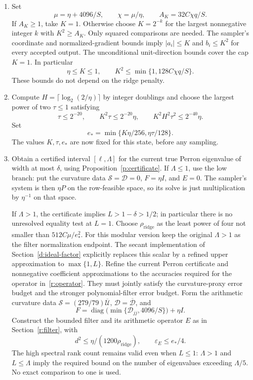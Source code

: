\documentclass[11pt]{amsart}
\theoremstyle{definition}\newtheorem{definition}[theorem]{Definition}
\theoremstyle{remark}\newtheorem{remark}[theorem]{Remark}
\numberwithin{equation}{section}
\begin{document}
\begin{enumerate}
\item Set
\[
 \mu=\eta+4096/S,\qquad\chi=\mu/\eta,
 \qquad A_K=32C\chi q/S.
\]
If $A_K\ge1$, take $K=1$. Otherwise choose $K=2^{-k}$ for the
largest nonnegative integer $k$ with $K^2\ge A_K$. Only squared
comparisons are needed. The sampler's coordinate and normalized-gradient bounds imply
$|a_i|\le K$ and $b_i\le K^2$ for every accepted output. The unconditional
unit-direction bounds cover the cap $K=1$. In particular
\[
 \eta\le K\le1,\qquad K^2\le\min\{1,128C\chi q/S\}.
\]
These bounds do not depend on the ridge penalty.

\item Compute $H=\lceil\log_2(2/\eta)\rceil$ by integer doublings and
choose the largest power of two $\tau\le1$ satisfying
\[
 \tau\le2^{-20},\qquad K^2\tau\le2^{-20}\eta,
 \qquad K^2H^2\tau^2\le2^{-40}\eta.
\]
Set
\[
 e_* =\min\{K\eta/256,\eta\tau/128\}.
\]
The values $K,\tau,e_*$ are now fixed for this state, before any sampling.

\item Obtain a certified interval $[\ell,\Lambda]$ for the current true
Perron eigenvalue of width at most $\delta$, using
Proposition~\ref{p:certificate}. If $\Lambda\le1$, use the low
branch: put the curvature data $\mathcal S=\mathcal D=0$, $F=\eta I$, and
$E=0$. The sampler's system is then $\eta P$ on the row-feasible space,
so its solve is just multiplication by $\eta^{-1}$ on that space.

If $\Lambda>1$, the certificate implies $L>1-\delta>1/2$; in particular
there is no unresolved equality test at $L=1$. Choose $\rho_{\mathrm{ridge}}$ as the least
power of four not smaller than $512C\mu/e_*^2$. For this modular version keep the original
$\Lambda>1$ as the filter normalization endpoint. The secant
implementation of Section~\ref{d:ideal-factor} explicitly replaces
this scalar by a refined upper approximation to $\max\{1,L\}$. Refine the current Perron
certificate and nonnegative coefficient approximations to the accuracies
required for the operator in~\eqref{r:operator}. They must jointly satisfy the
curvature-proxy error budget and the stronger polynomial-filter error
budget. Form the arithmetic curvature data
$\mathcal S=(279/79)\overline{\mathcal U}$,
$\mathcal D=\overline{\mathcal D}$, and
\[
 F=\operatorname{diag}\bigl(\min\{\mathcal D_{jj},4096/S\}\bigr)+\eta I.
\]
Construct the bounded filter and its arithmetic operator
$E$ as in Section~\ref{r:filter}, with
\[
 d^2\le\eta/(1200\rho_{\mathrm{ridge}}),\qquad\varepsilon_E\le e_*/4.
\]
The high spectral rank count remains valid even when $L\le1$:
$\Lambda>1$ and $L\le\Lambda$ imply the required bound on the number of
eigenvalues exceeding $\Lambda/5$. No exact comparison to one is used.


\end{enumerate}
\end{document}
